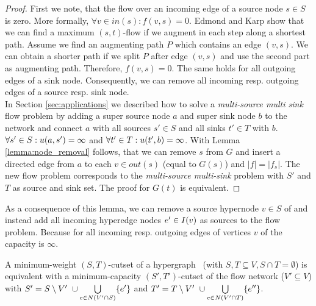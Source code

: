 \begin{proof}
First we note, that the flow over an incoming edge of a source node $s \in S$ is zero.
More formally, $\forall v \in in(s): f(v,s) = 0$. Edmond and Karp \cite{edmonds1972theoretical} 
show that we can find a maximum $(s,t)$-flow if we augment in each step along a shortest path. 
Assume we find an augmenting path $P$ which contains an edge $(v,s)$. We
can obtain a shorter path if we split $P$ after edge $(v,s)$ and use the second part as
augmenting path. Therefore, $f(v,s) = 0$. The same holds for all outgoing edges of a sink
node. Consequently, we can remove all incoming resp. outgoing edges of a source resp. sink node. \\
In Section \ref{sec:applications} we described how to solve a \emph{multi-source 
multi sink} flow problem by adding a super source node $a$ and super sink node $b$ to the network
and connect $a$ with all sources $s' \in S$ and all sinks $t' \in T$ with $b$.
$\forall s' \in S: u(a,s') = \infty$ and $\forall t' \in T: u(t',b) = \infty$. With Lemma
\ref{lemma:node_removal} follows, that we can remove $s$ from $G$ and insert
a directed edge from $a$ to each $v \in out(s)$ (equal to $G(s)$) and $|f| = |f_s|$. The new flow problem
corresponds to the \emph{multi-source multi-sink} problem with $S'$ and $T$ as source
and sink set. The proof for $G(t)$ is equivalent.
\end{proof}

As a consequence of this lemma, we can remove 
a source hypernode $v \in S$ of  and instead add all
incoming hyperedge nodes $e' \in I(v)$ as sources to the flow 
problem. Because for all incoming resp. outgoing edges of vertices $v$ of 
 the capacity is $\infty$.

\begin{theorem}
\label{theorem:st_cutset_equal}
A minimum-weight $(S,T)$-cutset of a hypergraph \HypergraphDef~(with $S,T \subseteq V,
S \cap T = \emptyset$) is equivalent with a minimum-capacity $(S',T')$-cutset of the
flow network  ($V' \subseteq V$) with $S' = S \setminus V'\ \cup \bigcup\limits_{e \in N(V' \cap S)} \{e'\}$ and 
$T' = T \setminus V'\ \cup \bigcup\limits_{e \in N(V'\cap T)} \{e''\}$.
\label{theorem:heuer_network}
\end{theorem}

